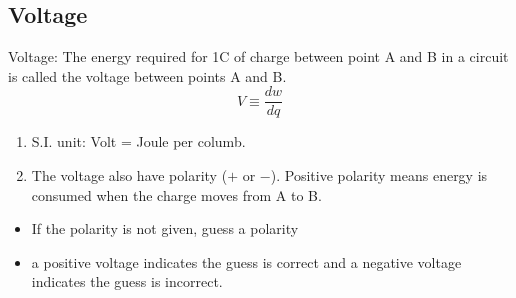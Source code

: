 \documentclass{article}
\begin{document}
    \subsection{Voltage}
    \begin{definition}
        Voltage: The energy required for 1C of charge between point A and B in a circuit is called the voltage between points A and B. 
        \begin{equation}
            V\equiv\frac{dw}{dq}
        \end{equation} 
        \begin{enumerate}
            \item S.I. unit: Volt = Joule per columb.
            \item The voltage also have polarity ($+$ or $-$). Positive polarity means energy is consumed when the charge moves from A to B.
        \end{enumerate}
    \end{definition}
    \begin{itemize}
        \item If the polarity is not given, guess a polarity 
        \item a positive voltage indicates the guess is correct and a negative voltage indicates the guess is incorrect.
    \end{itemize}
\end{document}
